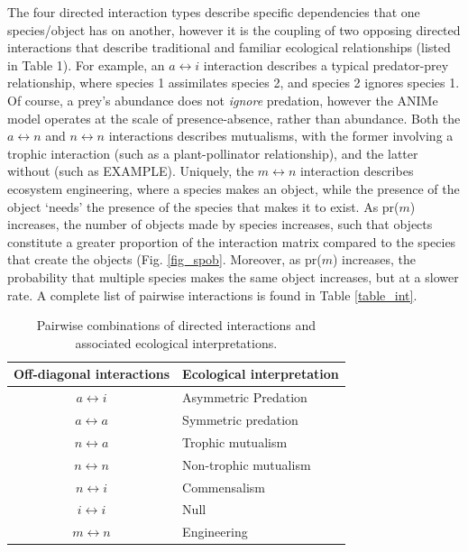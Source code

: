 \documentclass[twocolumn,preprintnumbers,amsmath,amssymb,superscriptaddress]{revtex4}
\begin{document}
The four directed interaction types describe specific dependencies that one species/object has on another, however it is the coupling of two opposing directed interactions that describe traditional and familiar ecological relationships (listed in Table 1).
For example, an $a \leftrightarrow i$ interaction describes a typical predator-prey relationship, where species 1 assimilates species 2, and species 2 ignores species 1.
Of course, a prey's abundance does not \emph{ignore} predation, however the ANIMe model operates at the scale of presence-absence, rather than abundance.
Both the $a \leftrightarrow n$ and $n \leftrightarrow n$ interactions describes mutualisms, with the former involving a trophic interaction (such as a plant-pollinator relationship), and the latter without (such as EXAMPLE).
Uniquely, the $m \leftrightarrow n$ interaction describes ecosystem engineering, where a species makes an object, while the presence of the object `needs' the presence of the species that makes it to exist.
As pr($m$) increases, the number of objects made by species increases, such that objects constitute a greater proportion of the interaction matrix compared to the species that create the objects (Fig. \ref{fig_spob}.
Moreover, as pr($m$) increases, the probability that multiple species makes the same object increases, but at a slower rate.
A complete list of pairwise interactions is found in Table \ref{table_int}.


\begin{table}[h]
  \begin{tabular}{ c  l }
    \hline
    Off-diagonal interactions & Ecological interpretation \\
    \hline
    $a \leftrightarrow i$ & Asymmetric Predation \\
    $a \leftrightarrow a$ & Symmetric predation \\
    $n \leftrightarrow a$ & Trophic mutualism \\
    $n \leftrightarrow n$ & Non-trophic mutualism \\
    $n \leftrightarrow i$ & Commensalism \\
    $i \leftrightarrow i$ & Null \\
    $m \leftrightarrow n$ & Engineering \\
    \hline
  \end{tabular}
  \caption{Pairwise combinations of directed interactions and associated ecological interpretations.}
\end{table}
\end{document}
